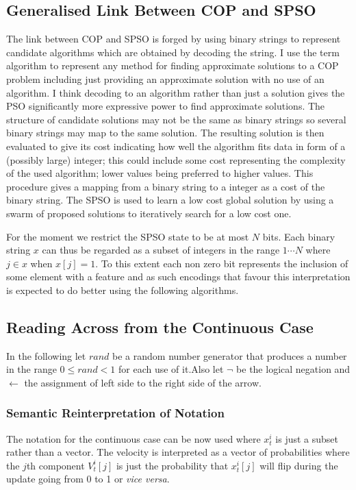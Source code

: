 \documentclass[a4paper,oneside,english]{article}
\numberwithin{equation}{section}
\numberwithin{figure}{section}
\begin{document}
\subsection{Generalised Link Between COP and SPSO}
The link between COP and SPSO is forged by using binary strings to represent candidate algorithms which are obtained by decoding the string. I use the term algorithm to represent any method for finding approximate solutions to a COP problem including just providing an approximate solution with no use of an algorithm. I think decoding to an algorithm rather than just a solution gives the PSO significantly more expressive power to find approximate solutions. The structure of candidate solutions may not be the same as binary strings  so several binary strings may map to the same solution. The resulting solution is then evaluated to give its cost indicating how well the algorithm fits data in form of a (possibly large) integer; this could include some cost representing the complexity of the used algorithm; lower values being preferred to higher values. This procedure gives a mapping from a binary string to a integer as a cost of the binary string. The SPSO is used to learn a low cost global solution by using a swarm of proposed solutions to iteratively search for a low cost one.  

For the moment we restrict the SPSO state to be at most $N$ bits. Each binary string $x$ can thus be regarded as a subset of integers in the range $1 \cdots N$  where $j \in x$ when $x[j] = 1$. To this extent each non zero bit represents the inclusion of some element with a feature and as such encodings that favour this interpretation is expected to do better using the following algorithms. 

\subsection{Reading Across from the Continuous Case}
In the following let $rand$ be a random number generator that produces a number in the range $0\leq rand < 1$ for each use of it.Also let $\neg$ be the logical negation and $\leftarrow$ the assignment of left side to the right side of the arrow.

\subsubsection{Semantic Reinterpretation of Notation }
The notation for the continuous case can be now used where $x_t^i$ is just a subset rather than a vector. The velocity is interpreted as a vector of probabilities  where the $j$th component $V_t^i[j]$ is just the probability that $x_t^i[j]$ will flip during the update going from 0 to 1 or \textit{vice versa}.
\end{document}
